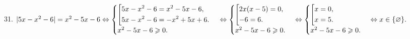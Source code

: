 31. $|5x-x^2-6|=x^2-5x-6 \Leftrightarrow \begin{cases}\left[
      \begin{gathered} 5x-x^2-6=x^2-5x-6,\hfill\\
      5x-x^2-6=-x^2+5x+6.\hfill \end{gathered}\right.\\
x^2-5x-6\geqslant0.\end{cases}\Leftrightarrow \begin{cases}\left[
      \begin{gathered} 2x(x-5)=0,\hfill\\
      -6=6.\hfill \end{gathered}\right.\\
x^2-5x-6\geqslant0.\end{cases}\Leftrightarrow \begin{cases}\left[
      \begin{gathered} x=0,\hfill\\
      x=5.\hfill \end{gathered}\right.\\
x^2-5x-6\geqslant0.\end{cases}\Leftrightarrow x\in\{\varnothing\}.$\\
